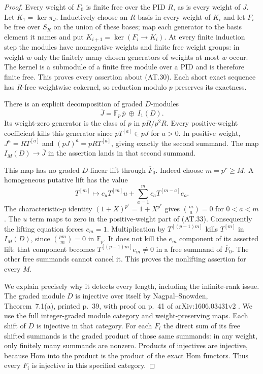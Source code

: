 \begin{proof}
Every weight of $F_0$ is finite free over the PID $R$, as is
every weight of $J$.  Let $K_1=\ker\pi_J$.
Inductively choose an $R$-basis in every weight of $K_i$ and
let $F_i$ be free over $S_R$ on the union of these bases;
map each generator to the basis element it names and put
$K_{i+1}=\ker(F_i\to K_i)$.  At every finite induction step
the modules have nonnegative weights and finite free weight
groups: in weight $w$ only the finitely many chosen generators
of weights at most $w$ occur.  The kernel is a submodule of
a finite free module over a PID and is therefore finite free.
This proves every assertion about \textup{(AT.30)}.  Each short
exact sequence has $R$-free weightwise cokernel, so reduction
modulo $p$ preserves its exactness.

There is an explicit decomposition of graded $D$-modules
\[
 \overline J=\mathbb F_p\,\overline p\ \oplus\ I_1(D).
 \tag{AT.33}
\]
Its weight-zero generator is the class of $p$ in $pR/p^2R$.
Every positive-weight coefficient kills this generator since
$pT^{[a]}\in pJ$ for $a>0$.  In positive weight, $J^a=R T^{[a]}$
and $(pJ)^a=pR T^{[a]}$, giving exactly the second summand.
The map $I_M(D)\to\overline J$ in the assertion lands in
that second summand.

This map has no graded $D$-linear lift through $\overline F_0$.
Indeed choose $m=p^r\geq M$.  A homogeneous putative lift has
the value
\[
 T^{[m]}\longmapsto
 c_uT^{[m]}u+\sum_{a=1}^m c_aT^{[m-a]}e_a.
\]
The characteristic-$p$ identity $(1+X)^{p^r}=1+X^{p^r}$
gives $\binom ma=0$ for $0<a<m$.  The $u$ term maps to zero
in the positive-weight part of \textup{(AT.33)}.
Consequently the lifting equation forces $c_m=1$.
Multiplication by $T^{[(p-1)m]}$ kills $T^{[m]}$ in $I_M(D)$,
since $\binom{pm}{m}=0$ in $\mathbb F_p$.
It does not kill the $e_m$ component of its asserted lift:
that component becomes $T^{[(p-1)m]}e_m\ne0$ in a free
summand of $\overline F_0$.  The other free summands cannot
cancel it.  This proves the nonlifting assertion for every $M$.

We explain precisely why it detects every length, including
the infinite-rank issue.  The graded module $D$ is injective
over itself by Nagpal--Snowden, Theorem~7.1(a), printed
p.~39, with proof on p.~41 of arXiv:1606.03431v2
\cite{IC-nagpal-snowden}.  We use the full integer-graded
module category and weight-preserving maps.  Each shift of
$D$ is injective in that category.  For each $\overline F_i$
the direct sum of its free shifted summands is the graded
product of those same summands: in any weight, only finitely
many summands are nonzero.  Products of injectives are
injective, because Hom into the product is the product of
the exact Hom functors.  Thus every $\overline F_i$ is
injective in this specified category.


\end{proof}

